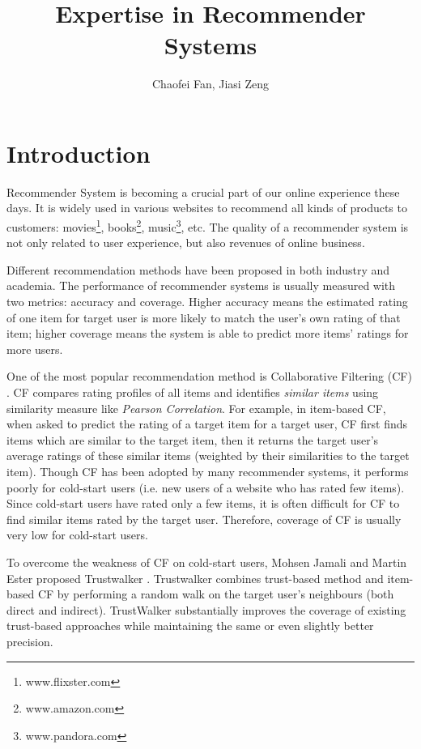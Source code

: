 \documentclass[12pt]{article}
\title{Expertise in Recommender Systems}
\author{Chaofei Fan, Jiasi Zeng}
\begin{document}
\maketitle

\section{Introduction}
Recommender System is becoming a crucial part of our online experience these days. It is widely used in various websites to recommend all kinds of products to customers: movies\footnote[1]{www.flixster.com}, books\footnote[2]{www.amazon.com}, music\footnote[3]{www.pandora.com}, etc. The quality of a recommender system is not only related to user experience, but also revenues of online business.  

Different recommendation methods have been proposed in both industry and academia. The performance of recommender systems is usually measured with two metrics: accuracy and coverage. Higher accuracy means the estimated rating of one item for target user is more likely to match the user's own rating of that item; higher coverage means the system is able to predict more items' ratings for more users. 

One of the most popular recommendation method is Collaborative Filtering (CF) \cite{Sarwar:2001p125}. CF compares rating profiles of all items and identifies \emph{similar items} using similarity measure like \emph{Pearson Correlation}. For example, in item-based CF, when asked to predict the rating of a target item for a target user, CF first finds items which are similar to the target item, then it returns the target user's average ratings of these similar items (weighted by their similarities to the target item). Though CF has been adopted by many recommender systems, it performs poorly for cold-start users (i.e. new users of a website who has rated few items). Since cold-start users have rated only a few items, it is often difficult for CF to find similar items rated by the target user. Therefore, coverage of CF is usually very low for cold-start users. 

To overcome the weakness of CF on cold-start users, Mohsen Jamali and Martin Ester proposed Trustwalker \cite{Jamali:2009p67}. Trustwalker combines trust-based method and item-based CF by performing a random walk on the target user's neighbours (both direct and indirect). TrustWalker substantially improves the coverage of existing trust-based approaches while maintaining the same or even slightly better precision.
\end{document}
